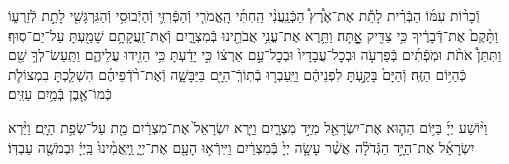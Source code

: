 \documentclass[twoside, openany, parskip=half, 11pt]{book}
\begin{document}
וְֿכָר֨וֹת עִמּ֜וֹ הַבְּֿרִ֗ית לָתֵ֡ת אֶת־אֶ֩רֶץ֩ הַכְּֿנַֽעֲנִ֨י הַֽחִתִּ֜י הָֽאֱמֹרִ֧י וְֿהַפְּֿרִזִּ֛י וְֿהַיְֿבוּסִ֥י וְֿהַגִּרְגָּשִׁ֖י לָתֵ֣ת לְֿזַרְע֑וֹ וַתָּ֨קֶם֙ אֶת־דְּֿבָרֶ֔יךָ כִּ֥י צַדִּ֖יק אׇׇׇׇָֽתָּה׃ וַתֵּ֥רֶא אֶת־עֳנִ֥י אֲבֹתֵ֖ינוּ בְּֿמִצְרָ֑יִם וְֿאֶת־זַֽעֲקָתָ֥ם שָׁמַ֖עְתָּ עַל־יַם־סֽוּף׃ וַתִּתֵּן֩ אֹתֹ֨ת וּמֹֽפְֿתִ֜ים בְּֿפַרְעֹ֤ה וּבְכׇל־עֲבָדָיו֙ וּבְכׇל־עַ֣ם אַרְצ֔וֹ כִּ֣י יָדַ֔עְתָּ כִּ֥י הֵזִ֖ידוּ עֲלֵיהֶ֑ם וַתַּֽעַשׂ־לְךָ֥ שֵׁ֖ם כְּֿהַיּ֥וֹם הַזֶּֽה׃
וְֿהַיָּם֙ בָּקַ֣עְתָּ לִפְנֵיהֶ֔ם וַיַּֽעַבְר֥וּ בְֿתֽוֹךְֿ־הַיָּ֖ם בַּיַּבָּשָׁ֑ה וְֿאֶת־רֹ֨דְֿפֵיהֶ֜ם הִשְׁלַ֧כְתָּ בִמְצוֹלֹ֛ת כְּֿמוֹ־אֶ֖בֶן בְּֿמַ֥יִם עַזִּֽים׃

וַיּ֨וֹשַׁע
יְיָ֜ בַּיּ֥וֹם הַה֛וּא אֶת־יִשְׂרָאֵ֖ל מִיַּ֣ד מִצְרָ֑יִם וַיַּ֤רְא יִשְׂרָאֵל֙ אֶת־מִצְרַ֔יִם מֵ֖ת עַל־שְׂפַ֥ת הַיָּֽם׃
וַיַּ֨רְא יִשְׂרָאֵ֜ל אֶת־הַיָּ֣ד הַגְּֿדֹלָ֗ה אֲשֶׁ֨ר עָשָׂ֤ה יְיָ֙ בְּֿמִצְרַ֔יִם וַיִּֽירְֿא֥וּ הָעָ֖ם אֶת־יְיָ֑ וַֽיַּֽאֲמִ֨ינוּ֙ בַּֽיְיָ֔ וּבְמֹשֶׁ֖ה עַבְדּֽוֹ׃
\end{document}
